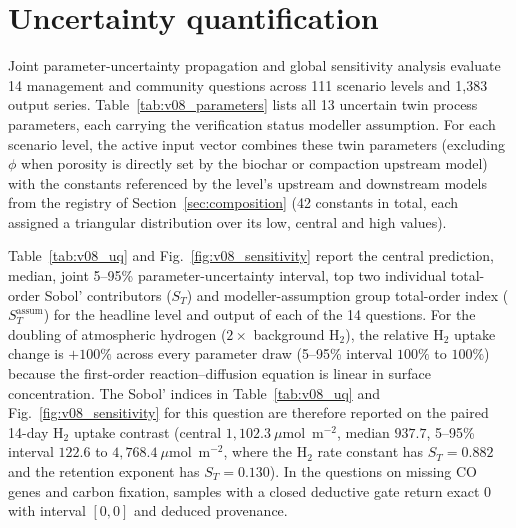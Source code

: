 \documentclass[11pt,a4paper]{article}
\begin{document}
\section{Uncertainty quantification}\label{sec:uq}
Joint parameter-uncertainty propagation and global sensitivity analysis evaluate 14 management and community questions across 111 scenario levels and 1,383 output series. Table~\ref{tab:v08_parameters} lists all 13 uncertain twin process parameters, each carrying the verification status modeller assumption. For each scenario level, the active input vector combines these twin parameters (excluding $\phi$ when porosity is directly set by the biochar or compaction upstream model) with the constants referenced by the level's upstream and downstream models from the registry of Section~\ref{sec:composition} (42 constants in total, each assigned a triangular distribution over its low, central and high values).

\begin{table}[!htbp]\centering\small\setlength{\tabcolsep}{3pt}
\caption{Twin process-parameter uncertainty registry. All 13 parameters carry the verification status modeller assumption; porosity is excluded from sampling in levels where the intervention directly clamps soil porosity.}\label{tab:v08_parameters}

\end{table}

Table~\ref{tab:v08_uq} and Fig.~\ref{fig:v08_sensitivity} report the central prediction, median, joint 5--95\% parameter-uncertainty interval, top two individual total-order Sobol' contributors ($S_T$) and modeller-assumption group total-order index ($S_T^{\mathrm{assum}}$) for the headline level and output of each of the 14 questions. For the doubling of atmospheric hydrogen ($2\times$ background H$_2$), the relative H$_2$ uptake change is $+100\%$ across every parameter draw (5--95\% interval $100\%$ to $100\%$) because the first-order reaction--diffusion equation is linear in surface concentration. The Sobol' indices in Table~\ref{tab:v08_uq} and Fig.~\ref{fig:v08_sensitivity} for this question are therefore reported on the paired 14-day H$_2$ uptake contrast (central $1,102.3~\mu$mol~m$^{-2}$, median $937.7$, 5--95\% interval $122.6$ to $4,768.4~\mu$mol~m$^{-2}$, where the H$_2$ rate constant has $S_T=0.882$ and the retention exponent has $S_T=0.130$). In the questions on missing CO genes and carbon fixation, samples with a closed deductive gate return exact 0 with interval $[0,0]$ and deduced provenance.
\end{document}
